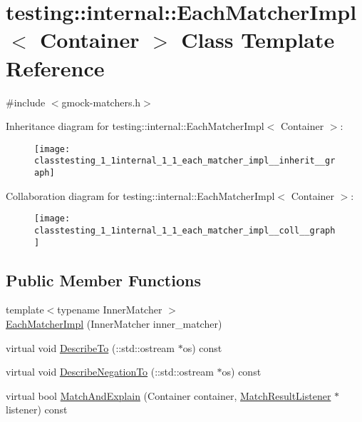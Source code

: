 \hypertarget{classtesting_1_1internal_1_1_each_matcher_impl}{}\section{testing\+:\+:internal\+:\+:Each\+Matcher\+Impl$<$ Container $>$ Class Template Reference}
\label{classtesting_1_1internal_1_1_each_matcher_impl}


{\ttfamily \#include $<$gmock-\/matchers.\+h$>$}



Inheritance diagram for testing\+:\+:internal\+:\+:Each\+Matcher\+Impl$<$ Container $>$\+:
\nopagebreak
\begin{figure}[H]
\begin{center}
\leavevmode
\texttt{[image: classtesting\_1\_1internal\_1\_1\_each\_matcher\_impl\_\_inherit\_\_graph]}
\end{center}
\end{figure}


Collaboration diagram for testing\+:\+:internal\+:\+:Each\+Matcher\+Impl$<$ Container $>$\+:
\nopagebreak
\begin{figure}[H]
\begin{center}
\leavevmode
\texttt{[image: classtesting\_1\_1internal\_1\_1\_each\_matcher\_impl\_\_coll\_\_graph]}
\end{center}
\end{figure}
\subsection*{Public Member Functions}
\begin{DoxyCompactItemize}
\item 
{\footnotesize template$<$typename Inner\+Matcher $>$ }\\\hyperlink{classtesting_1_1internal_1_1_each_matcher_impl_afe41214bf055abcdd60e475f207c7a0f}{Each\+Matcher\+Impl} (Inner\+Matcher inner\+\_\+matcher)
\item 
virtual void \hyperlink{classtesting_1_1internal_1_1_each_matcher_impl_a6a54a94c14435378e22e8b31670be0b8}{Describe\+To} (\+::std\+::ostream $\ast$os) const 
\item 
virtual void \hyperlink{classtesting_1_1internal_1_1_each_matcher_impl_a52941ed863914b8fd2dba5c229b57f30}{Describe\+Negation\+To} (\+::std\+::ostream $\ast$os) const 
\item 
virtual bool \hyperlink{classtesting_1_1internal_1_1_each_matcher_impl_a1c84c5cf88a78eed95c7bebf008f567c}{Match\+And\+Explain} (Container container, \hyperlink{classtesting_1_1_match_result_listener}{Match\+Result\+Listener} $\ast$listener) const 
\end{DoxyCompactItemize}

